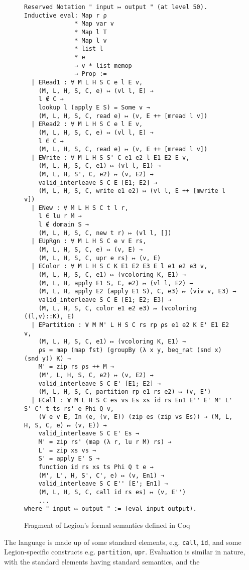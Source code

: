 \documentclass[sigconf]{acmart}
\begin{document}
\begin{figure*}
\centering
\begin{BVerbatim}
Reserved Notation " input ↦ output " (at level 50).
Inductive eval: Map r ρ 
              * Map var v
              * Map l T
              * Map l v
              * list l 
              * e 
              → v * list memop
              → Prop := 
  | ERead1 : ∀ M L H S C e l E v,
    (M, L, H, S, C, e) ↦ (vl l, E) →
    l ∉ C → 
    lookup l (apply E S) = Some v → 
    (M, L, H, S, C, read e) ↦ (v, E ++ [mread l v])
  | ERead2 : ∀ M L H S C e l E v,
    (M, L, H, S, C, e) ↦ (vl l, E) →
    l ∈ C → 
    (M, L, H, S, C, read e) ↦ (v, E ++ [mread l v]) 
  | EWrite : ∀ M L H S S' C e1 e2 l E1 E2 E v,
    (M, L, H, S, C, e1) ↦ (vl l, E1) →
    (M, L, H, S', C, e2) ↦ (v, E2) →
    valid_interleave S C E [E1; E2] →
    (M, L, H, S, C, write e1 e2) ↦ (vl l, E ++ [mwrite l v])
  | ENew : ∀ M L H S C t l r, 
    l ∈ lu r M →
    l ∉ domain S →
    (M, L, H, S, C, new t r) ↦ (vl l, [])
  | EUpRgn : ∀ M L H S C e v E rs,
    (M, L, H, S, C, e) ↦ (v, E) →
    (M, L, H, S, C, upr e rs) ↦ (v, E)
  | EColor : ∀ M L H S C K E1 E2 E3 E l e1 e2 e3 v, 
    (M, L, H, S, C, e1) ↦ (vcoloring K, E1) → 
    (M, L, H, apply E1 S, C, e2) ↦ (vl l, E2) → 
    (M, L, H, apply E2 (apply E1 S), C, e3) ↦ (viv v, E3) → 
    valid_interleave S C E [E1; E2; E3] →
    (M, L, H, S, C, color e1 e2 e3) ↦ (vcoloring ((l,v)::K), E) 
  | EPartition : ∀ M M' L H S C rs rp ρs e1 e2 K E' E1 E2 v, 
    (M, L, H, S, C, e1) ↦ (vcoloring K, E1) → 
    ρs = map (map fst) (groupBy (λ x y, beq_nat (snd x) (snd y)) K) →
    M' = zip rs ρs ++ M →  
    (M', L, H, S, C, e2) ↦ (v, E2) →
    valid_interleave S C E' [E1; E2] →
    (M, L, H, S, C, partition rp e1 rs e2) ↦ (v, E')  
  | ECall : ∀ M L H S C es vs Es xs id rs En1 E'' E' M' L' S' C' t ts rs' e Phi Q v, 
    (∀ e v E, In (e, (v, E)) (zip es (zip vs Es)) → (M, L, H, S, C, e) ↦ (v, E)) →
    valid_interleave S C E' Es →
    M' = zip rs' (map (λ r, lu r M) rs) →  
    L' = zip xs vs →
    S' = apply E' S → 
    function id rs xs ts Phi Q t e →
    (M', L', H, S', C', e) ↦ (v, En1) → 
    valid_interleave S C E'' [E'; En1] →
    (M, L, H, S, C, call id rs es) ↦ (v, E'')
    ...
where " input ↦ output " := (eval input output).
\end{BVerbatim}
\caption{Fragment of Legion's formal semantics defined in Coq}
\label{semantics}
\end{figure*}

The language is made up of some standard elements, e.g. \texttt{call},
\texttt{id}, and some Legion-specific constructs e.g. \texttt{partition},
\texttt{upr}. Evaluation is similar in nature, with the standard elements
having standard semantics, and the 
\end{document}
